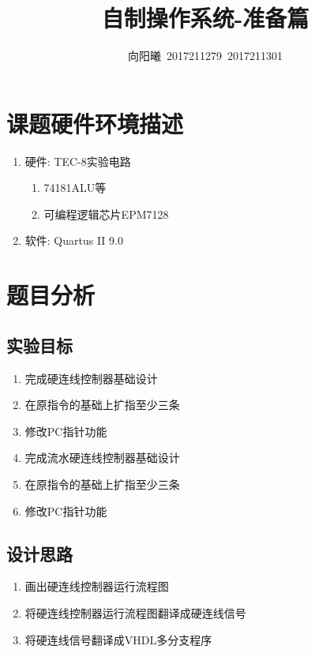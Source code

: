 \documentclass[UTF8]{ctexart}
\title{自制操作系统-准备篇}
\author{向阳曦\ 2017211279\ 2017211301}
\date{}
\begin{document}
\setlength{\parindent}{2em}
\setlength{\baselineskip}{2.5em}
\maketitle
\section{课题硬件环境描述}

\begin{enumerate}[1]
	\item 硬件: TEC-8实验电路
	\begin{enumerate}[1]
		\item 74181ALU等
		\item 可编程逻辑芯片EPM7128
	\end{enumerate}
	\item 软件: Quartus II 9.0
\end{enumerate}

\section{题目分析}
\subsection{实验目标}

\begin{enumerate}[1]
	\item 完成硬连线控制器基础设计
	\item 在原指令的基础上扩指至少三条
	\item 修改PC指针功能
	\item 完成流水硬连线控制器基础设计
	\item 在原指令的基础上扩指至少三条
	\item 修改PC指针功能
\end{enumerate}

\subsection{设计思路}

\begin{enumerate}[1]
	\item 画出硬连线控制器运行流程图
	\item 将硬连线控制器运行流程图翻译成硬连线信号
	\item 将硬连线信号翻译成VHDL多分支程序
\end{enumerate}
\end{document}
